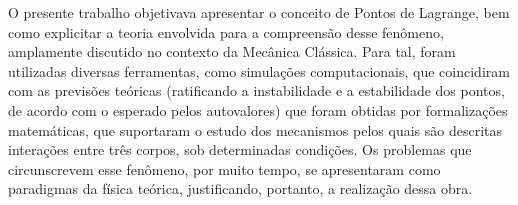 O presente trabalho objetivava apresentar o conceito de Pontos de Lagrange, bem como explicitar a teoria envolvida para a compreensão desse fenômeno, amplamente discutido no contexto da Mecânica Clássica. Para tal, foram utilizadas diversas ferramentas, como simulações computacionais, que coincidiram com as previsões teóricas (ratificando a instabilidade e a estabilidade dos pontos, de acordo com o esperado pelos autovalores) que foram obtidas por formalizações matemáticas, que suportaram o estudo dos mecanismos pelos quais são descritas interações entre três corpos, sob determinadas condições. Os problemas que circunscrevem esse fenômeno, por muito tempo, se apresentaram como  paradigmas da física teórica, justificando, portanto, a realização dessa obra.
